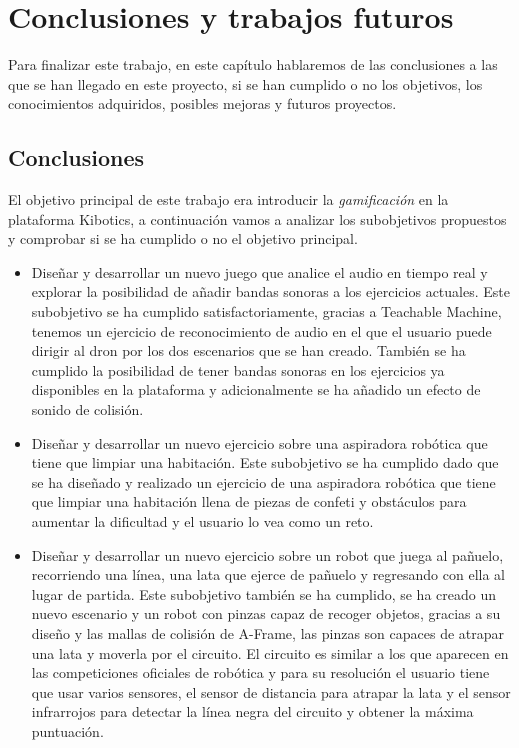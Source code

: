 \chapter{Conclusiones y trabajos futuros}\label{conclusion}
Para finalizar este trabajo, en este capítulo hablaremos de las conclusiones a las que se han llegado en este proyecto, si se han cumplido o no los objetivos,  los conocimientos adquiridos, posibles mejoras y futuros proyectos.

\section{Conclusiones}

El objetivo principal de este trabajo era introducir la \textit{gamificación} en la plataforma Kibotics, a continuación vamos a analizar los subobjetivos propuestos y comprobar si se ha cumplido o no el objetivo principal.

\begin{itemize}
    \item Diseñar y desarrollar un nuevo juego que analice el audio en tiempo real y explorar la posibilidad de añadir bandas sonoras a los ejercicios actuales.  Este subobjetivo se ha cumplido satisfactoriamente, gracias a Teachable Machine, tenemos un ejercicio de reconocimiento de audio en el que el usuario puede dirigir al dron por los dos escenarios que se han creado. También se ha cumplido la posibilidad de tener bandas sonoras en los ejercicios ya disponibles en la plataforma y adicionalmente se ha añadido un efecto de sonido de colisión. 

    \item Diseñar y desarrollar un nuevo ejercicio sobre una aspiradora robótica que tiene que limpiar una habitación.  Este subobjetivo se ha cumplido dado que se ha  diseñado y realizado un ejercicio de una aspiradora robótica que tiene que limpiar una habitación llena de piezas de confeti y obstáculos para aumentar la dificultad y el usuario lo vea como un reto.

    \item Diseñar y desarrollar un nuevo ejercicio sobre un robot que juega al pañuelo, recorriendo una línea, una lata que ejerce de pañuelo y regresando con ella al lugar de partida. Este subobjetivo también se ha cumplido, se ha creado un nuevo escenario y un robot con pinzas capaz de recoger objetos, gracias a su diseño y las mallas de colisión de A-Frame, las pinzas son capaces de atrapar una lata y moverla por el circuito. El circuito es similar a los que aparecen en las competiciones oficiales de robótica y para su resolución el usuario tiene que usar varios sensores, el sensor de distancia para atrapar la lata y el sensor infrarrojos para detectar la línea negra del circuito y obtener la máxima puntuación. 
\end{itemize}

